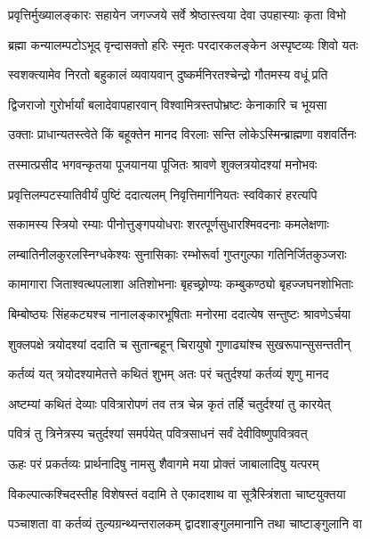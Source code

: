 \twolineshloka
{प्रवृत्तिर्मुख्यालङ्कारः सहायेन जगज्जये}
{सर्वे श्रेष्ठास्त्वया देवा उपहास्याः कृता विभो} %

\twolineshloka
{ब्रह्मा कन्यालम्पटोऽभूद् वृन्दासक्तो हरिः स्मृतः}
{परदारकलङ्केन अस्पृष्टव्यः शिवो यतः} %

\twolineshloka
{स्वशक्त्यामेव निरतो बहुकालं व्यवायवान्}
{दुष्कर्मनिरतश्चेन्द्रो गौतमस्य वधूं प्रति} %

\twolineshloka
{द्विजराजो गुरोर्भार्यां बलादेवापहारवान्}
{विश्वामित्रस्तपोभ्रष्टः केनाकारि च भूयसा} %

\twolineshloka
{उक्ताः प्राधान्यतस्त्वेते किं बहूक्तेन मानद}
{विरलाः सन्ति लोकेऽस्मिन्ब्राह्मणा वशवर्तिनः} %

\twolineshloka
{तस्मात्प्रसीद भगवन्कृतया पूजयानया}
{पूजितः श्रावणे शुक्लत्रयोदश्यां मनोभवः} %

\twolineshloka
{प्रवृत्तिलम्पटस्यातिवीर्यं पुष्टिं ददात्यलम्}
{निवृत्तिमार्गनियतः स्वविकारं हरत्यपि} %

\twolineshloka
{सकामस्य स्त्रियो रम्याः पीनोत्तुङ्गपयोधराः}
{शरत्पूर्णसुधारश्मिवदनाः कमलेक्षणाः} %

\twolineshloka
{लम्बातिनीलकुरलस्निग्धकेश्यः सुनासिकाः}
{रम्भोरूर्वा गुप्तगुल्फा गतिनिर्जितकुञ्जराः} %

\twolineshloka
{कामागारा जिताश्वत्थपलाशा अतिशोभनाः}
{बृहच्छ्रोण्यः कम्बुकण्ठ्यो बृहज्जघनशोभिताः} %

\twolineshloka
{बिम्बोष्ठ्यः सिंहकट्यश्च नानालङ्कारभूषिताः}
{मनोरमा ददात्येष सन्तुष्टः श्रावणेऽर्चया} %

\twolineshloka
{शुक्लपक्षे त्रयोदश्यां ददाति च सुतान्बहून्}
{चिरायुषो गुणाढ्यांश्च सुखरूपान्सुसन्ततीन्} %

\twolineshloka
{कर्तव्यं यत् त्रयोदश्यामेतत्ते कथितं शुभम्}
{अतः परं चतुर्दश्यां कर्तव्यं शृणु मानद} %

\twolineshloka
{अष्टम्यां कथितं देव्याः पवित्रारोपणं तव}
{तत्र चेन्न कृतं तर्हि चतुर्दश्यां तु कारयेत्} %

\twolineshloka
{पवित्रं तु त्रिनेत्रस्य चतुर्दश्यां समर्पयेत्}
{पवित्रसाधनं सर्वं देवीविष्णुपवित्रवत्} %

\twolineshloka
{ऊहः परं प्रकर्तव्यः प्रार्थनादिषु नामसु}
{शैवागमे मया प्रोक्तं जाबालादिषु यत्परम्} %

\twolineshloka
{विकल्पात्कश्चिदस्तीह विशेषस्तं वदामि ते}
{एकादशाथ वा सूत्रैस्त्रिंशता चाष्टयुक्तया} %

\twolineshloka
{पञ्चाशता वा कर्तव्यं तुल्यग्रन्थ्यन्तरालकम्}
{द्वादशाङ्गुलमानानि तथा चाष्टाङ्गुलानि वा} %

